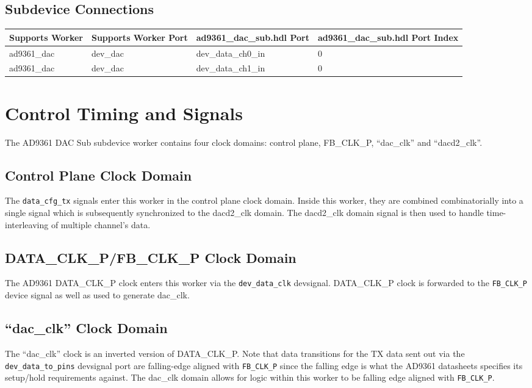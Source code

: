 \documentclass{article}
\def\comp{ad9361\_dac\_sub}
\def\Comp{AD9361 DAC Sub}
\begin{document}
\begin{landscape}
	\section*{Subdevice Connections}
	\begin{scriptsize}
		\begin{tabular}{|p{5cm}|p{5cm}|p{5cm}|p{7.22cm}|}
			\hline
			\rowcolor{blue}
			Supports Worker & Supports Worker Port & \comp{}.hdl Port     & \comp{}.hdl Port Index \\
			\hline
			ad9361\_dac     & dev\_dac             & dev\_data\_ch0\_in & 0 \\
			\hline
			ad9361\_dac     & dev\_dac             & dev\_data\_ch1\_in & 0 \\
			\hline
		\end{tabular}
	\end{scriptsize}

\end{landscape}

\section*{Control Timing and Signals}
The \Comp{} subdevice worker contains four clock domains: control plane, FB\_CLK\_P, ``dac\_clk'' and ``dacd2\_clk''.
\subsection*{Control Plane Clock Domain}
The \verb+data_cfg_tx+ signals enter this worker in the control plane clock domain. Inside this worker, they are combined combinatorially into a single signal which is subsequently synchronized to the dacd2\_clk domain. The dacd2\_clk domain signal is then used to handle time-interleaving of multiple channel's data.
\subsection*{DATA\_CLK\_P/FB\_CLK\_P Clock Domain}
The AD9361 DATA\_CLK\_P clock enters this worker via the \verb+dev_data_clk+ devsignal. DATA\_CLK\_P clock is forwarded to the \verb+FB_CLK_P+ device signal as well as used to generate dac\_clk.
\subsection*{``dac\_clk'' Clock Domain}
The ``dac\_clk'' clock is an inverted version of DATA\_CLK\_P. Note that data transitions for the TX data sent out via the \verb+dev_data_to_pins+ devsignal port are falling-edge aligned with \verb+FB_CLK_P+ since the falling edge is what the AD9361 datasheets specifies its setup/hold requirements against\cite{adi_ug570}. The dac\_clk domain allows for logic within this worker to be falling edge aligned with \verb+FB_CLK_P+.
\end{document}
